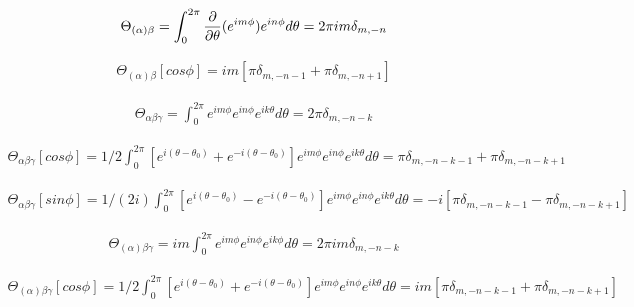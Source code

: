 \documentclass{Note}
\begin{document}
\begin{equation}
\begin{aligned}
\Theta_{(\alpha)\beta}=\int_0^{2\pi} {\partial \over \partial \theta}(e^{im\phi}) e^{in\phi} d\theta
=2\pi im \delta_{m,-n}
\end{aligned}
\end{equation}


\begin{equation}
\begin{aligned}
\Theta_{(\alpha)\beta}[cos\phi]=im[ \pi \delta_{m,-n-1}+\pi \delta_{m,-n+1}]
\end{aligned}
\end{equation}

\begin{equation}
\begin{aligned}
\Theta_{\alpha\beta\gamma}=\int_0^{2\pi} e^{im\phi} e^{in\phi}  e^{ik\theta} d\theta
=2\pi \delta_{m,-n-k}
\end{aligned}
\end{equation}

\begin{equation}
\begin{aligned}
\Theta_{\alpha\beta\gamma}[cos\phi]=1/2 \int_0^{2\pi} [e^{i(\theta-\theta_0)}+e^{-i(\theta-\theta_0)}]  e^{im\phi} e^{in\phi}  e^{ik\theta} d\theta
=\pi \delta_{m,-n-k-1}+\pi \delta_{m,-n-k+1}
\end{aligned}
\end{equation}


\begin{equation}
\begin{aligned}
\Theta_{\alpha\beta\gamma}[sin\phi]=1/(2i) \int_0^{2\pi} [e^{i(\theta-\theta_0)}-e^{-i(\theta-\theta_0)}]  e^{im\phi} e^{in\phi}  e^{ik\theta} d\theta
=-i[\pi \delta_{m,-n-k-1}-\pi \delta_{m,-n-k+1}]
\end{aligned}
\end{equation}

\begin{equation}
\begin{aligned}
\Theta_{(\alpha)\beta\gamma}=im \int_0^{2\pi} e^{im\phi} e^{in\phi}  e^{ik\phi} d\theta
=2\pi im\delta_{m,-n-k}
\end{aligned}
\end{equation}

\begin{equation}
\begin{aligned}
\Theta_{(\alpha)\beta\gamma}[cos\phi]=1/2 \int_0^{2\pi} [e^{i(\theta-\theta_0)}+e^{-i(\theta-\theta_0)}]  e^{im\phi} e^{in\phi}  e^{ik\theta} d\theta
=im[\pi \delta_{m,-n-k-1}+\pi \delta_{m,-n-k+1}]
\end{aligned}
\end{equation}
\end{document}
